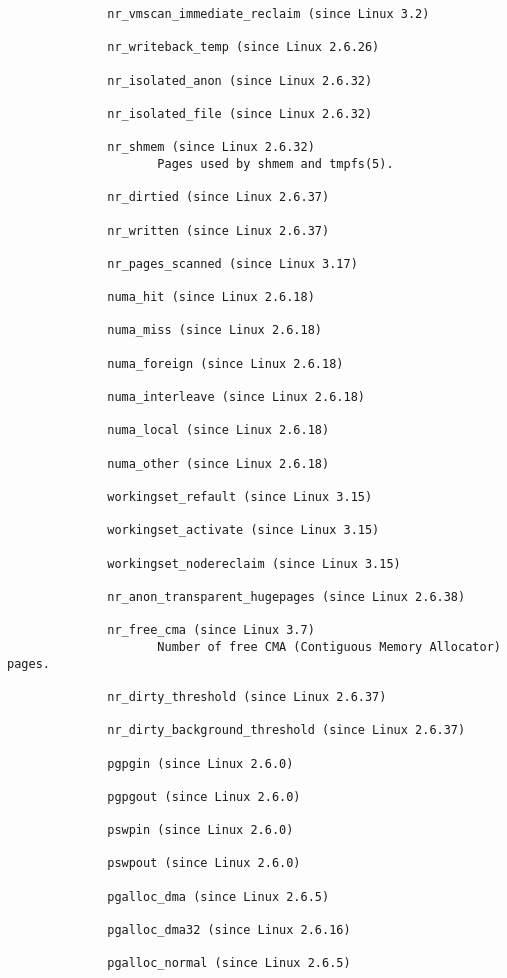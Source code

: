 \documentclass[]{article}
\begin{document}
\begin{verbatim}
              nr_vmscan_immediate_reclaim (since Linux 3.2)

              nr_writeback_temp (since Linux 2.6.26)

              nr_isolated_anon (since Linux 2.6.32)

              nr_isolated_file (since Linux 2.6.32)

              nr_shmem (since Linux 2.6.32)
                     Pages used by shmem and tmpfs(5).

              nr_dirtied (since Linux 2.6.37)

              nr_written (since Linux 2.6.37)

              nr_pages_scanned (since Linux 3.17)

              numa_hit (since Linux 2.6.18)

              numa_miss (since Linux 2.6.18)

              numa_foreign (since Linux 2.6.18)

              numa_interleave (since Linux 2.6.18)

              numa_local (since Linux 2.6.18)

              numa_other (since Linux 2.6.18)

              workingset_refault (since Linux 3.15)

              workingset_activate (since Linux 3.15)

              workingset_nodereclaim (since Linux 3.15)

              nr_anon_transparent_hugepages (since Linux 2.6.38)

              nr_free_cma (since Linux 3.7)
                     Number of free CMA (Contiguous Memory Allocator) pages.

              nr_dirty_threshold (since Linux 2.6.37)

              nr_dirty_background_threshold (since Linux 2.6.37)

              pgpgin (since Linux 2.6.0)

              pgpgout (since Linux 2.6.0)

              pswpin (since Linux 2.6.0)

              pswpout (since Linux 2.6.0)

              pgalloc_dma (since Linux 2.6.5)

              pgalloc_dma32 (since Linux 2.6.16)

              pgalloc_normal (since Linux 2.6.5)


\end{verbatim}
\end{document}

